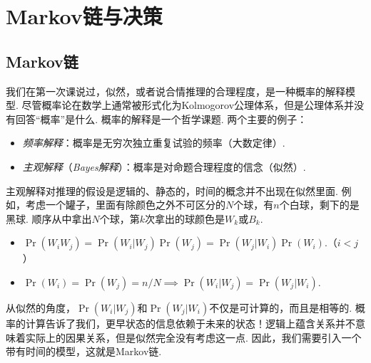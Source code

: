 \chapter{Markov链与决策}\label{chap:markov-chain}

\begingroup
\newcommand{\pref}{Chapters/Markov-chain/figures}

\renewcommand{\P}{\mathcal P}
\newcommand{\MS}{\mathcal S}
\newcommand{\M}{\mathcal M}

\section{Markov链}

我们在第一次课说过，似然，或者说合情推理的合理程度，是一种概率的解释模型. 尽管概率论在数学上通常被形式化为Kolmogorov公理体系，但是公理体系并没有回答``概率''是什么. 概率的解释是一个哲学课题. 两个主要的例子：
\begin{itemize}
\item \emph{频率解释}：概率是无穷次独立重复试验的频率（大数定律）.
\item \emph{主观解释}（\emph{Bayes解释}）：概率是对命题合理程度的信念（似然）.
\end{itemize}

主观解释对推理的假设是逻辑的、静态的，时间的概念并不出现在似然里面. 例如，考虑一个罐子，里面有除颜色之外不可区分的$N$个球，有$n$个白球，剩下的是黑球. 顺序从中拿出$N$个球，第$k$次拿出的球颜色是$W_k$或$B_k$.
\begin{itemize}
    \item $\Pr(W_iW_j)=\Pr(W_i|W_j)\Pr(W_j)=\Pr(W_j|W_i)\Pr(W_i)$.（$i<j$）
    \item $\Pr(W_i)=\Pr(W_j)=n/N\implies\Pr(W_i|W_j)=\Pr(W_j|W_i)$.
\end{itemize}
从似然的角度，$\Pr(W_i|W_j)$和$\Pr(W_j|W_i)$不仅是可计算的，而且是相等的. 概率的计算告诉了我们，更早状态的信息依赖于未来的状态！逻辑上蕴含关系并不意味着实际上的因果关系，但是似然完全没有考虑这一点. 因此，我们需要引入一个带有时间的模型，这就是Markov链.

